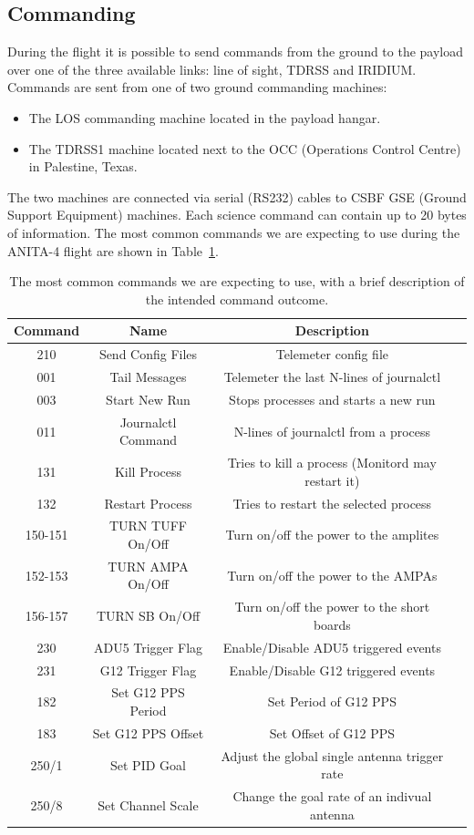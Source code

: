 \documentclass{article}
\begin{document}
\subsection{Commanding} \label{s:commanding}
During the flight it is possible to send commands from the ground to the payload over one of the three available links: line of sight, TDRSS and IRIDIUM. Commands are sent from one of two ground commanding machines:
\begin{itemize}
\item The LOS commanding machine  located in the payload hangar.
\item The TDRSS1 machine located next to the OCC (Operations Control Centre) in Palestine, Texas.
\end{itemize}
The two machines are connected via serial (RS232) cables to CSBF GSE (Ground Support Equipment) machines. Each science command can contain up to 20 bytes of information. The most common commands we are expecting to use during the ANITA-4 flight are shown in Table~\ref{tab:commands}.
\begin{table}[hbt]
  \centering

  \begin{tabular}{|c||c|c|c|}
    \hline
    Command & Name & Description  \\
    \hline 
    210 & Send Config Files & Telemeter config file  \\
    001 & Tail Messages & Telemeter the last N-lines of journalctl  \\
    003 & Start New Run & Stops processes and starts a new run \\
    011 & Journalctl Command &  N-lines of journalctl from a process \\
    131 & Kill Process & Tries to kill a process (Monitord may restart it)\\
    132 & Restart Process & Tries to restart the selected process  \\
    150-151 & TURN TUFF On/Off & Turn on/off the power to the amplites \\
    152-153 & TURN AMPA On/Off & Turn on/off the power to the AMPAs \\
    156-157 & TURN SB On/Off & Turn on/off the power to the short boards \\
    230 & ADU5 Trigger Flag & Enable/Disable ADU5 triggered events  \\
    231 & G12 Trigger Flag & Enable/Disable G12 triggered events  \\
    182 & Set G12 PPS Period & Set Period of G12 PPS  \\
    183 & Set G12 PPS Offset & Set Offset of G12 PPS  \\
    250/1 & Set PID Goal & Adjust the global single antenna trigger rate  \\
    250/8 & Set Channel Scale & Change the goal rate of an indivual antenna  \\
    \hline
  \end{tabular}
  \caption{The most common commands we are expecting to use, with a brief description of the intended command outcome.}
  \label{tab:commands}
\end{table}
\end{document}

